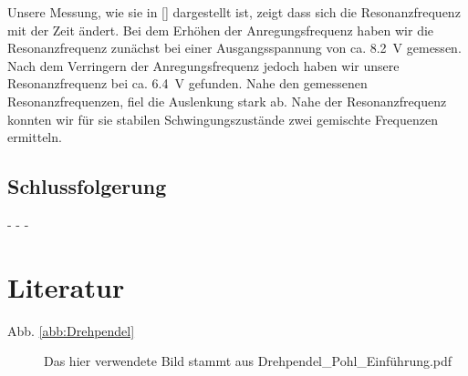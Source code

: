 \documentclass[11pt,a4paper,titlepage, ngerman]{article}
\newcommand{\refabb}[1]{Abb. \ref{abb:#1}}
\begin{document}
			Unsere Messung, wie sie in \ref{} dargestellt ist, zeigt dass sich die Resonanzfrequenz mit der Zeit ändert. Bei dem Erhöhen der Anregungsfrequenz haben wir die Resonanzfrequenz zunächst bei einer Ausgangsspannung von ca. \SI{8,2}{\V} gemessen. Nach dem Verringern der Anregungsfrequenz jedoch haben wir unsere Resonanzfrequenz bei ca. \SI{6,4}{\V} gefunden. Nahe den gemessenen Resonanzfrequenzen, fiel die Auslenkung stark ab.
			Nahe der Resonanzfrequenz konnten wir für sie stabilen Schwingungszustände zwei gemischte Frequenzen ermitteln. %
			
		\subsection*{Schlussfolgerung}
			
			- - -

	\vspace{1cm}		
	\section*{Literatur}
		\begin{description}
			\item[\refabb{Drehpendel}] Das hier verwendete Bild stammt aus \glqq Drehpendel\_Pohl\_Einführung.pdf\grqq
		\end{description}
\end{document}
